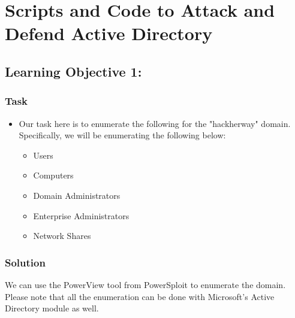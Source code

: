 \chapter{Scripts and Code to Attack and Defend Active Directory}

\section{Learning Objective 1:}
\subsection{Task}
\begin{itemize}
    \item Our task here is to enumerate the following for the "hackherway" domain. Specifically, we will be enumerating the following below:
    \begin{itemize}
        \item Users
        \item Computers
        \item Domain Administrators
        \item Enterprise Administrators
        \item Network Shares
    \end{itemize}
\end{itemize}

\subsection{Solution}
We can use the PowerView tool from PowerSploit to enumerate the domain. Please note that all the enumeration can be done with Microsoft's Active Directory module as well.

